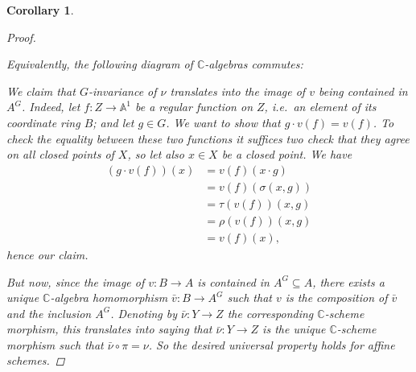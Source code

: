 \documentclass[12pt,a4paper]{amsart}
\theoremstyle{plain}
\newtheorem{cor}[thm]{Corollary}
\theoremstyle{definition}
\theoremstyle{remark}
\begin{document}
\begin{cor}
\begin{proof}
    \begin{center}
    \end{center}

    Equivalently, the following diagram of $\mathbb{C}$-algebras commutes:

    \begin{center}
    \end{center}

    We claim that $G$-invariance of $\nu$ translates into the image of $v$ being contained in $A^{G}$.
    Indeed, let $f \colon Z \to \mathbb{A}^{1}$ be a regular function on $Z$, i.e.~an element of its coordinate ring $B$; and let $g \in G$.
    We want to show that $g \cdot v(f) = v(f)$.
    To check the equality between these two functions it suffices two check that they agree on all closed points of $X$, so let also $x \in X$ be a closed point.
    We have
    \begin{align*}
      (g \cdot v(f))(x) & = v(f)(x \cdot g) \\
      & = v(f)(\sigma(x, g)) \\
      & = \tau(v(f))(x,g) \\
      & = \rho(v(f))(x,g) \\
      & = v(f)(x),
    \end{align*}
    hence our claim.
    
    But now, since the image of $v \colon B \to A$ is contained in $A^{G} \subseteq A$, there exists a unique $\mathbb{C}$-algebra homomorphism $\bar{v} \colon B \to A^{G}$ such that $v$ is the composition of $\bar{v}$ and the inclusion $A^{G}$.
    Denoting by $\bar{\nu} \colon Y \to Z$ the corresponding $\mathbb{C}$-scheme morphism, this translates into saying that $\bar{\nu} \colon Y \to Z$ is the unique $\mathbb{C}$-scheme morphism such that $\bar{\nu} \circ \pi = \nu$.
    So the desired universal property holds for affine schemes.


\end{proof}
\end{cor}
\end{document}
